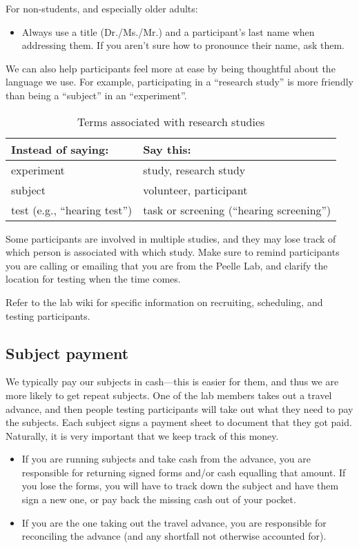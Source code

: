 \documentclass[letterpaper,12pt,oneside]{memoir}
\begin{document}
For non-students, and especially older adults:

\begin{itemize}
\item Always use a title (Dr./Ms./Mr.) and a participant's last name when addressing them. If you aren't sure how to pronounce their name, ask them.
\end{itemize}

We can also help participants feel more at ease by being thoughtful about the language we use. For example, participating in a ``research study'' is more friendly than being a ``subject'' in an ``experiment''.

\begin{table}
\centering
\caption{Terms associated with research studies}
\begin{tabular}{ll}
\toprule
Instead of saying: & Say this:\\
\midrule
experiment& study, research study\\
subject& volunteer, participant\\
test (e.g., ``hearing test'')& task or screening (``hearing screening'')\\
\bottomrule
\end{tabular}
\end{table}


Some participants are involved in multiple studies, and they may lose track of which person is associated with which study. Make sure to remind participants you are calling or emailing that you are from the Peelle Lab, and clarify the location for testing when the time comes.

Refer to the lab wiki for specific information on recruiting, scheduling, and testing participants.


\subsection{Subject payment}
\label{sec:subject_payment}

We typically pay our subjects in cash---this is easier for them, and thus we are more likely to get repeat subjects. One of the lab members takes out a travel advance, and then people testing participants will take out what they need to pay the subjects. Each subject signs a payment sheet to document that they got paid. Naturally, it is very important that we keep track of this money.

\begin{itemize}

\item If you are running subjects and take cash from the advance, you are responsible for returning signed forms and/or cash equalling that amount. If you lose the forms, you will have to track down the subject and have them sign a new one, or pay back the missing cash out of your pocket.

\item If you are the one taking out the travel advance, you are responsible for reconciling the advance (and any shortfall not otherwise accounted for).

\end{itemize}
\end{document}
